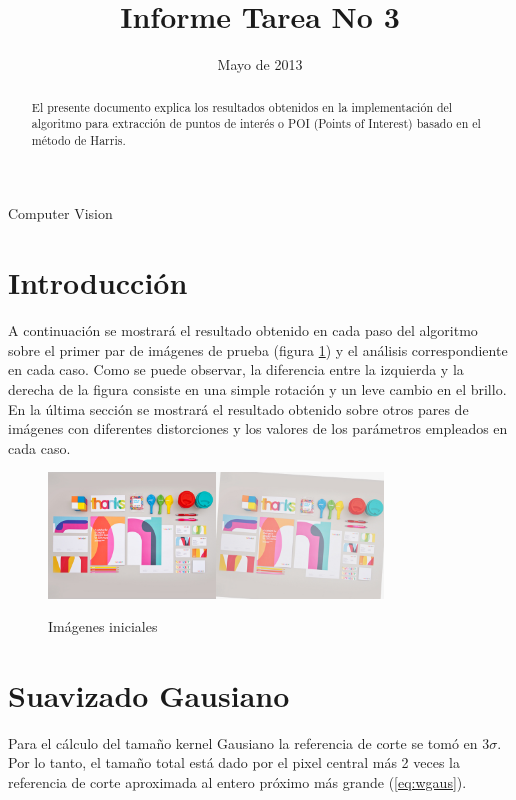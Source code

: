 \documentclass{IEEEtran}
\begin{document}
\title{Informe Tarea No 3}
\date {Mayo de 2013}
\author{
}
\maketitle


\begin{abstract}
El presente documento explica los resultados obtenidos en la implementación del algoritmo
para extracción de puntos de interés o POI (Points of Interest) basado en el método de Harris.
\end{abstract}

\begin{IEEEkeywords}
Computer Vision
\end{IEEEkeywords}

\section{Introducción}

A continuación se mostrará el resultado obtenido en cada paso del algoritmo
sobre el primer par de imágenes de prueba (figura \ref{fig:img1}) y el análisis 
correspondiente en cada caso. Como se puede observar, la diferencia entre la izquierda
y la derecha de la figura consiste en una simple rotación y un leve cambio en el brillo.
En la última sección se mostrará el resultado
obtenido sobre otros pares de imágenes con diferentes distorciones
y los valores de los parámetros empleados
en cada caso.


\begin{figure}[H]
\caption{Imágenes iniciales}
\centering
\includegraphics[width=8.9cm,natwidth=1200,natheight=450]{figs/img1.png}
\label{fig:img1}
\end{figure} 

\section{Suavizado Gausiano}
Para el cálculo del tamaño kernel Gausiano la referencia de corte se tomó en
$3 \sigma$. Por lo tanto, el tamaño total está dado por el pixel central 
más 2 veces la referencia de corte aproximada al entero próximo más grande (\ref{eq:wgaus}).
\end{document}
